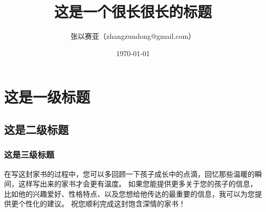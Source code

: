 \documentclass[12pt, a4paper]{ctexart}
\title{这是一个很长很长的标题}
\author{张以赛亚（zhangzundong@gmail.com）}
\date{\today}
\begin{document}

\tableofcontents
\newpage
\section{这是一级标题}
\subsection{这是二级标题}
\subsubsection{这是三级标题}
在写这封家书的过程中，您可以多回顾一下孩子成长中的点滴，回忆那些温暖的瞬间，这样写出来的家书才会更有温度。
如果您能提供更多关于您的孩子的信息，比如他的兴趣爱好、性格特点、以及您想给他传达的最重要的信息，我可以为您提供更个性化的建议。
祝您顺利完成这封饱含深情的家书！
\end{document}
